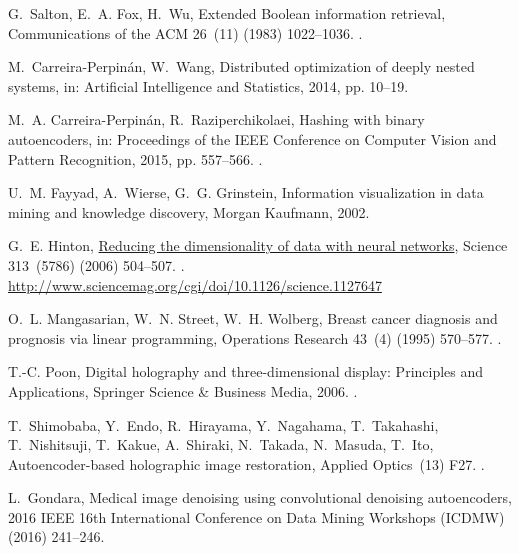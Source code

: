 \documentclass[preprint,5p,compress]{elsarticle}
\begin{document}
\begin{thebibliography}{100}
G.~Salton, E.~A. Fox, H.~Wu, {Extended Boolean information retrieval},
  Communications of the ACM 26~(11) (1983) 1022--1036.
\newblock \href {http://dx.doi.org/10.1145/182.358466}
  {}.

M.~Carreira-Perpin\'an, W.~Wang, Distributed optimization of deeply nested
  systems, in: Artificial Intelligence and Statistics, 2014, pp. 10--19.

M.~A. Carreira-Perpin\'an, R.~Raziperchikolaei, Hashing with binary
  autoencoders, in: Proceedings of the {IEEE} Conference on Computer Vision and
  Pattern Recognition, 2015, pp. 557--566.
\newblock \href {http://dx.doi.org/10.1109/CVPR.2015.7298654}
  {}.

U.~M. Fayyad, A.~Wierse, G.~G. Grinstein, Information visualization in data
  mining and knowledge discovery, Morgan Kaufmann, 2002.

G.~E. Hinton,
  \href{http://www.sciencemag.org/cgi/doi/10.1126/science.1127647}{Reducing the
  dimensionality of data with neural networks}, Science 313~(5786) (2006)
  504--507.
\newblock \href {http://dx.doi.org/10.1126/science.1127647}
  {}.
\newline\urlprefix\url{http://www.sciencemag.org/cgi/doi/10.1126/science.1127647}

O.~L. Mangasarian, W.~N. Street, W.~H. Wolberg, Breast cancer diagnosis and
  prognosis via linear programming, Operations Research 43~(4) (1995) 570--577.
\newblock \href {http://dx.doi.org/10.1287/opre.43.4.570}
  {}.

T.-C. Poon, Digital holography and three-dimensional display: Principles and
  Applications, Springer Science \& Business Media, 2006.
\newblock \href {http://dx.doi.org/10.1007/0-387-31397-4}
  {}.

T.~Shimobaba, Y.~Endo, R.~Hirayama, Y.~Nagahama, T.~Takahashi, T.~Nishitsuji,
  T.~Kakue, A.~Shiraki, N.~Takada, N.~Masuda, T.~Ito, {Autoencoder-based
  holographic image restoration}, Applied Optics~(13)  F27.
\newblock \href {http://dx.doi.org/10.1364/AO.56.000F27}
  {}.

L.~Gondara, Medical image denoising using convolutional denoising autoencoders,
  2016 IEEE 16th International Conference on Data Mining Workshops (ICDMW)
  (2016) 241--246\href {http://dx.doi.org/10.1109/ICDMW.2016.0041}
  {}.


\end{thebibliography}
\end{document}
